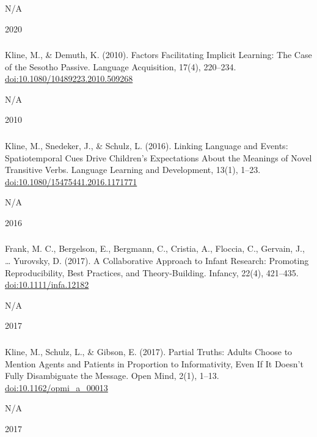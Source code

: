 \documentclass[
]{article}
\begin{document}
N/A

2020

\hypertarget{section-3}{%
\subsubsection{}\label{section-3}}

Kline, M., \& Demuth, K. (2010). Factors Facilitating Implicit Learning:
The Case of the Sesotho Passive. Language Acquisition, 17(4), 220--234.
\url{doi:10.1080/10489223.2010.509268}

N/A

2010

\hypertarget{section-4}{%
\subsubsection{}\label{section-4}}

Kline, M., Snedeker, J., \& Schulz, L. (2016). Linking Language and
Events: Spatiotemporal Cues Drive Children's Expectations About the
Meanings of Novel Transitive Verbs. Language Learning and Development,
13(1), 1--23. \url{doi:10.1080/15475441.2016.1171771}

N/A

2016

\hypertarget{section-5}{%
\subsubsection{}\label{section-5}}

Frank, M. C., Bergelson, E., Bergmann, C., Cristia, A., Floccia, C.,
Gervain, J., \ldots{} Yurovsky, D. (2017). A Collaborative Approach to
Infant Research: Promoting Reproducibility, Best Practices, and
Theory-Building. Infancy, 22(4), 421--435. \url{doi:10.1111/infa.12182}

N/A

2017

\hypertarget{section-6}{%
\subsubsection{}\label{section-6}}

Kline, M., Schulz, L., \& Gibson, E. (2017). Partial Truths: Adults
Choose to Mention Agents and Patients in Proportion to Informativity,
Even If It Doesn't Fully Disambiguate the Message. Open Mind, 2(1),
1--13. \url{doi:10.1162/opmi_a_00013}

N/A

2017
\end{document}

